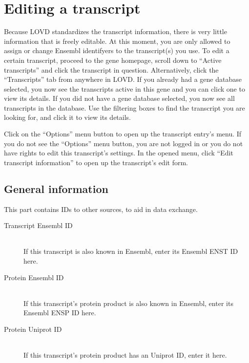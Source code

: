 \documentclass[a4paper,oneside,openany,12pt]{memoir}
\renewenvironment{leftbar}[1][\hsize]
{%
    \def\FrameCommand
    {%
        {\color{LOVDdark}\vrule width 3pt \hspace{5pt}}%
        \colorbox{LOVDlight}%
    }%
    \MakeFramed{\hsize#1\advance\hsize-\width\FrameRestore}%
}
{\endMakeFramed}
\begin{document}
\section{Editing a transcript}
Because LOVD standardizes the transcript information, there is very little information that is freely editable.
At this moment, you are only allowed to assign or change Ensembl identifyers to the transcript(s) you use.
To edit a certain transcript, proceed to the gene homepage, scroll down to ``Active transcripts'' and click the transcript in question.
Alternatively, click the ``Transcripts'' tab from anywhere in LOVD.
If you already had a gene database selected, you now see the transcripts active in this gene and you can click one to view its details.
If you did not have a gene database selected, you now see all transcripts in the database.
Use the filtering boxes to find the transcript you are looking for, and click it to view its details.
\\
\par
Click on the ``Options'' menu button to open up the transcript entry's menu.
If you do not see the ``Options'' menu button, you are not logged in or you do not have rights to edit this transcript's settings.
In the opened menu, click ``Edit transcript information'' to open up the transcript's edit form.



\subsection{General information}
This part contains IDs to other sources, to aid in data exchange.
\begin{description}
  \item[Transcript Ensembl ID] \hfill \\
  If this transcript is also known in Ensembl, enter its Ensembl ENST ID here.
  \item[Protein Ensembl ID] \hfill \\
  If this transcript's protein product is also known in Ensembl, enter its Ensembl ENSP ID here.
  \item[Protein Uniprot ID] \hfill \\
  If this transcript's protein product has an Uniprot ID, enter it here.
\end{description}
\end{document}
